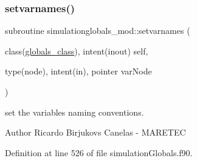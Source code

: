 \subsubsection{\texorpdfstring{setvarnames()}{setvarnames()}}
{\footnotesize\ttfamily subroutine simulationglobals\+\_\+mod\+::setvarnames (\begin{DoxyParamCaption}\item[{class(\mbox{\hyperlink{structsimulationglobals__mod_1_1globals__class}{globals\+\_\+class}}), intent(inout)}]{self,  }\item[{type(node), intent(in), pointer}]{var\+Node }\end{DoxyParamCaption})\hspace{0.3cm}{\ttfamily [private]}}



set the variables naming conventions. 

\begin{DoxyAuthor}{Author}
Ricardo Birjukovs Canelas -\/ M\+A\+R\+E\+T\+EC 
\end{DoxyAuthor}


Definition at line 526 of file simulation\+Globals.\+f90.


